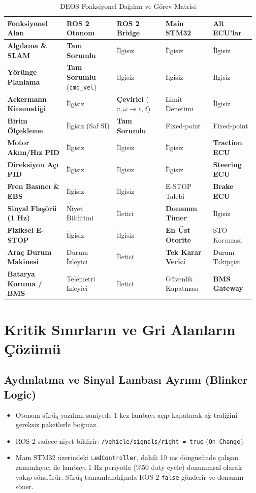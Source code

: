 \documentclass[a4paper,11pt]{article}
\begin{document}
\begin{table}[h]
\centering
\small
\begin{tabularx}{\textwidth}{|L{4.2cm}|L{2.8cm}|L{2.8cm}|L{2.8cm}|Y|}
\hline
\textbf{Fonksiyonel Alan} & \textbf{ROS 2 Otonom} & \textbf{ROS 2 Bridge} & \textbf{Main STM32} & \textbf{Alt ECU'lar} \\
\hline
\textbf{Algılama \& SLAM} & \textbf{Tam Sorumlu} & İlgisiz & İlgisiz & İlgisiz \\
\hline
\textbf{Yörünge Planlama} & \textbf{Tam Sorumlu} (\texttt{cmd\_vel}) & İlgisiz & İlgisiz & İlgisiz \\
\hline
\textbf{Ackermann Kinematiği} & İlgisiz & \textbf{Çevirici} ($v, \omega \rightarrow v, \delta$) & Limit Denetimi & İlgisiz \\
\hline
\textbf{Birim Ölçekleme} & İlgisiz (Saf SI) & \textbf{Tam Sorumlu} & Fixed-point & Fixed-point \\
\hline
\textbf{Motor Akım/Hız PID} & İlgisiz & İlgisiz & İlgisiz & \textbf{Traction ECU} \\
\hline
\textbf{Direksiyon Açı PID} & İlgisiz & İlgisiz & İlgisiz & \textbf{Steering ECU} \\
\hline
\textbf{Fren Basıncı \& EBS} & İlgisiz & İlgisiz & E-STOP Talebi & \textbf{Brake ECU} \\
\hline
\textbf{Sinyal Flaşörü (1 Hz)} & Niyet Bildirimi & İletici & \textbf{Donanım Timer} & İlgisiz \\
\hline
\textbf{Fiziksel E-STOP} & İlgisiz & İlgisiz & \textbf{En Üst Otorite} & STO Koruması \\
\hline
\textbf{Araç Durum Makinesi} & Durum İzleyici & İletici & \textbf{Tek Karar Verici}& Durum Takipçisi \\
\hline
\textbf{Batarya Koruma / BMS} & Telemetri İzleyici & İletici & Güvenlik Kapatması & \textbf{BMS Gateway} \\
\hline
\end{tabularx}
\caption{DEOS Fonksiyonel Dağılım ve Görev Matrisi}
\end{table}

\section{Kritik Sınırların ve Gri Alanların Çözümü}

\subsection{Aydınlatma ve Sinyal Lambası Ayrımı (Blinker Logic)}
\begin{itemize}
    \item Otonom sürüş yazılımı saniyede 1 kez lambayı açıp kapatarak ağ trafiğini gereksiz paketlerle boğmaz.
    \item ROS 2 sadece niyet bildirir: \texttt{/vehicle/signals/right = true} (\texttt{On Change}).
    \item Main STM32 üzerindeki \texttt{LedController}, dahili 10 ms döngüsünde çalışan zamanlayıcı ile lambayı 1 Hz periyotla (\%50 duty cycle) donanımsal olarak yakıp söndürür. Sürüş tamamlandığında ROS 2 \texttt{false} gönderir ve donanım söner.
\end{itemize}
\end{document}
